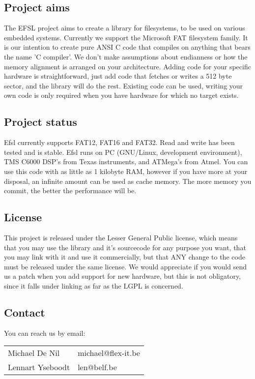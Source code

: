 \subsection{Project aims}
The EFSL project aims to create a library for filesystems, to be used on
various embedded systems. Currently we support the Microsoft FAT filesystem
family. It is our intention to create pure ANSI C code that compiles on
anything that bears the name 'C compiler'. We don't make assumptions about
endianness or how the memory alignment is arranged on your architecture.
\newline\newline
Adding code for your specific hardware is straightforward, just add code that
fetches or writes a 512 byte sector, and the library will do the rest.
Existing code can be used, writing your own code is only required when you
have hardware for which no target exists.
\subsection{Project status}
Efsl currently supports FAT12, FAT16 and FAT32. Read and write has been tested
and is stable. Efsl runs on PC (GNU/Linux, development environment),
TMS C6000 DSP's from Texas instruments, and ATMega's from Atmel.
You can use this code with as little as 1 kilobyte RAM, however if you have
more at your disposal, an infinite amount can be used as cache memory.
The more memory you commit, the better the performance will be.
\subsection{License}
This project is released under the Lesser General Public license, which
means that you may use the library and it's sourcecode for any purpose you want,
that you may link with it and use it commercially, but that ANY change to the
code must be released under the same license. We would appreciate if you would  send
us a patch when you add support for new hardware, but this is not obligatory, since it
falls under linking as far as the LGPL is concerned.
\subsection{Contact}
You can reach us by email:\\
\begin{tabular}{ll}
    Michael De Nil & michael@flex-it.be\\
    Lennart Yseboodt & len@belf.be\\
\end{tabular}